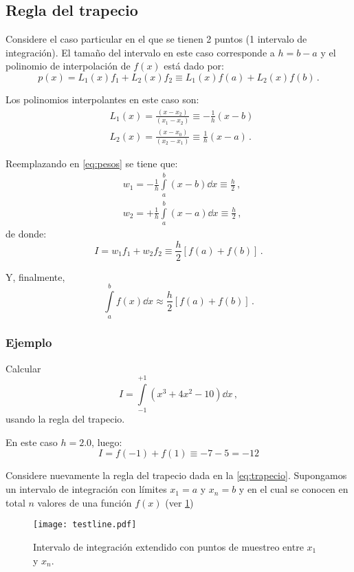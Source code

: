 \subsection{Regla del trapecio}
Considere el caso particular en el que se tienen 2 puntos (1 intervalo de 
integración). El tamaño del intervalo en este caso corresponde a 
$h = b - a$ y el polinomio de interpolación de $f(x)$ está dado por:
\[p(x) = L_1(x) f_1 + L_2(x) f_2 \equiv L_1(x) f(a) + L_2(x) f(b)\, .\]

Los polinomios interpolantes en este caso son:
\begin{align*}
  &L_1(x) = \frac{(x - x_2)}{(x_1 - x_2)} \equiv  - \frac{1}{h}(x - b)\, \\
  &L_2(x) = \frac{(x - x_0)}{(x_2 - x_1)} \equiv \frac{1}{h}(x - a)\, .
\end{align*}

Reemplazando en \eqref{eq:pesos} se tiene que:
\begin{align*}
  &w_1 =  - \frac{1}{h}\int\limits_a^b (x - b) \dd{x}  \equiv \frac{h}{2}\, ,\\
  &w_2 =  + \frac{1}{h}\int\limits_a^b (x - a) \dd{x}  \equiv \frac{h}{2}\, ,
\end{align*}
de donde:
\[I = w_1 f_1 + w_2 f_2 \equiv \frac{h}{2}\left[f(a) + f(b)\right]\, .\]

Y, finalmente,
\begin{equation}
  \int\limits_a^b f(x) \dd{x} \approx \frac{h}{2}[ f(a) + f(b)]\, .
  \label{eq:trapecio}
\end{equation}

\subsubsection*{Ejemplo}
Calcular
\[I=\int\limits_{-1}^{+1} (x^3 + 4 x^2 - 10) \dd{x}\, ,\]
usando la regla del trapecio.

En este caso \(h=2.0\), luego:
\[I = f(-1) + f(1) \equiv  -7 - 5 = -12\]

Considere nuevamente la regla del trapecio dada en la \cref{eq:trapecio}. 
Supongamos un intervalo de integración con límites $x_1 = a$ y $x_n = b$ 
y en el cual se conocen en total $n$ valores de una función $f(x)$ (ver 
\cref{fig:test})
\begin{figure}[H]
\centering
\texttt{[image: testline.pdf]}
\caption{Intervalo de integración extendido con puntos de muestreo entre $x_1$ 
y $x_n$.}
\label{fig:test}
\end{figure}

